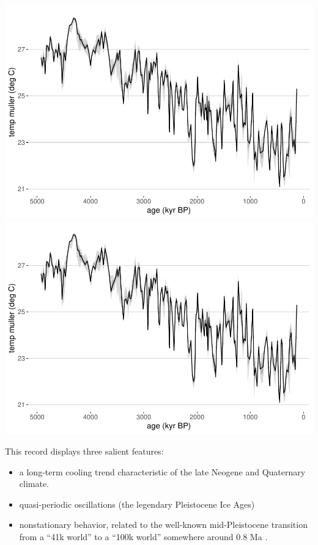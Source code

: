 \documentclass[gc, manuscript]{copernicus}
\begin{document}
\includegraphics{geoChronR-paper_files/figure-latex/unnamed-chunk-9-1.pdf} \includegraphics{geoChronR-paper_files/figure-latex/unnamed-chunk-9-2.pdf}

This record displays three salient features:

\begin{itemize}
\item
  a long-term cooling trend characteristic of the late Neogene and Quaternary climate.
\item
  quasi-periodic oscillations (the legendary Pleistocene Ice Ages)
\item
  nonstationary behavior, related to the well-known mid-Pleistocene transition from a ``41k world'' to a ``100k world'' somewhere around 0.8 Ma \citep{Paillard_2001}.
\end{itemize}
\end{document}
